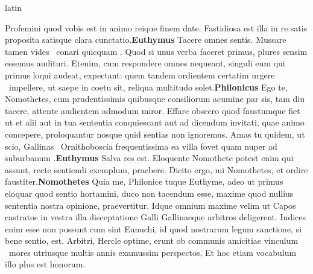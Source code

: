 \documentclass[12pt]{book}
\renewenvironment{latin}
    	{\begin{hyphenrules}{latin}}
    	{\end{hyphenrules}}
\begin{document}
\begin{pages}
\begin{latin}
\begin{Leftside}
                    Profemini quod vobis est in animo reique finem date. 
                    Fastidiosa est illa in re satis proposita satisque clara cunctatio.\pend\pstart\textbf{Euthymus }\hspace{1cm} Tacere omnes sentis. 
                    Mussare tamen vides ﻿\ampersand\ conari quicquam . 
                    Quod si unus verba faceret primus, plures sensim essemus audituri. 
                    Etenim, cum respondere omnes nequeant, singuli eum qui primus loqui audeat, expectant: 
                    quem tandem ordientem certatim urgere ﻿\ampersand\ impellere, ut saepe in coetu sit, reliqua multitudo solet.\pend\pstart\textbf{Philonicus }\hspace{1cm} Ego te, Nomothetes, cum prudentissimis quibusque consiliorum acumine par sis, tam 
            diu tacere, attente audientem admodum miror. 
                    Effare obsecro 
            quod  faustumque fiet 
                    ut et alii aut in tua sententia conquiescant aut
            ad dicendum invitati, quae animo concepere, proloquantur nosque   
            quid sentias non ignoremus. 
                    Amas tu quidem, ut scio, Gallinas ﻿\ampersand\ Ornithoboscia frequentissima ea villa fovet quam nuper ad 
            suburbanum .\pend\pstart\textbf{Euthymus }\hspace{1cm} Salva res est. Eloquente Nomothete potest enim  qui assunt, recte sentiendi exemplum, praebere. 
                    Dicito ergo, mi Nomothetes, et ordire faustiter.\pend\pstart\textbf{Nomothetes }\hspace{1cm} Quia me, Philonice tuque Euthyme, adeo ut primus eloquar 
                    quod sentio hortamini, duco non tacendum esse, maxime quod nullius
                    sententia nostra opinione, praevertitur. 
                    Idque omnium maxime velim ut 
                    Capos castratos in vestra illa disceptatione Galli Gallinaeque arbitros deligerent. 
                    Iudices enim esse non possunt cum sint Eunuchi, 
                    id quod nostrarum legum sanctione, si bene sentio,  est. 
                    Arbitri, Hercle optime, erunt ob communis amicitiae vinculum ﻿\ampersand\ mores utriusque multis annis examussim perspectos, 
                    Et hoc etiam vocabulum illo plus est honorum. 

\end{Leftside}
\end{latin}
\end{pages}
\end{document}
